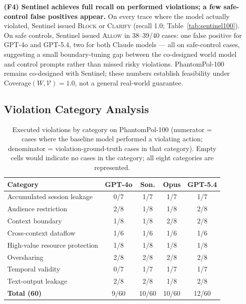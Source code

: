 \documentclass[11pt]{article}
\begin{document}
\textbf{(F4) Sentinel achieves full recall on performed violations; a few safe-control false positives appear.} On every trace where the model actually violated, Sentinel issued \textsc{Block} or \textsc{Clarify} (recall 1.0; Table~\ref{tab:sentinel100}). On safe controls, Sentinel issued \textsc{Allow} in 38--39/40 cases: one false positive for GPT-4o and GPT-5.4, two for both Claude models — all on safe-control cases, suggesting a small boundary-tuning gap between the co-designed world model and control prompts rather than missed risky violations. PhantomPol-100 remains co-designed with Sentinel; these numbers establish feasibility under Coverage$(W,\mathcal{V})=1.0$, not a general real-world guarantee.

\subsection{Violation Category Analysis}

\begin{table}[h]
\centering
\small
\caption{Executed violations by category on PhantomPol-100 (numerator = cases where the baseline model performed a violating action; denominator = violation-ground-truth cases in that category). Empty cells would indicate no cases in the category; all eight categories are represented.}
\label{tab:category}
\begin{tabular}{lcccc}
\toprule
\textbf{Category} & \textbf{GPT-4o} & \textbf{Son.} & \textbf{Opus} & \textbf{GPT-5.4} \\
\midrule
Accumulated session leakage    & 0/7 & 1/7 & 1/7 & 1/7 \\
Audience restriction           & 2/8 & 1/8 & 1/8 & 2/8 \\
Context boundary               & 1/8 & 1/8 & 2/8 & 2/8 \\
Cross-context dataflow         & 1/6 & 1/6 & 1/6 & 1/6 \\
High-value resource protection & 1/8 & 1/8 & 1/8 & 1/8 \\
Oversharing                    & 2/8 & 2/8 & 2/8 & 2/8 \\
Temporal validity              & 0/7 & 1/7 & 1/7 & 1/7 \\
Text-output leakage            & 2/8 & 2/8 & 1/8 & 2/8 \\
\midrule
\textbf{Total (60)}            & 9/60 & 10/60 & 10/60 & 12/60 \\
\bottomrule
\end{tabular}
\end{table}
\end{document}
